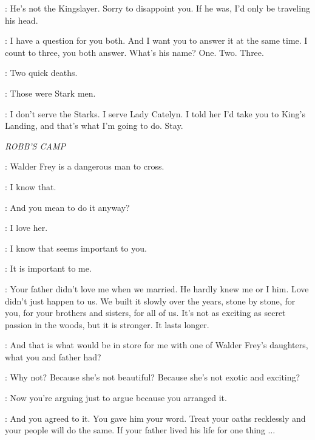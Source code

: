 \BRIENNE: He's not the Kingslayer. Sorry to disappoint you. If he was, I'd only be traveling his head. 

\STARKSOLDIERb: I have a question for you both. And I want you to answer it at the same time. I count to three, you both answer. What's his name? One. Two. Three. 


\BRIENNE: Two quick deaths. 


\JAIME: Those were Stark men. 

\BRIENNE: I don't serve the Starks. I serve Lady Catelyn. I told her I'd take you to King's Landing, and that's what I'm going to do. Stay.


\scene

\textit{ROBB'S CAMP} 


\CATELYN: Walder Frey is a dangerous man to cross. 

\ROBB: I know that. 

\CATELYN: And you mean to do it anyway? 

\ROBB: I love her. 

\CATELYN: I know that seems important to you. 

\ROBB: It is important to me. 

\CATELYN: Your father didn't love me when we married. He hardly knew me or I him. Love didn't just happen to us. We built it slowly over the years, stone by stone, for you, for your brothers and sisters, for all of us. It's not as exciting as secret passion in the woods, but it is stronger. It lasts longer. 

\ROBB: And that is what would be in store for me with one of Walder Frey's daughters, what you and father had? 

\CATELYN: Why not? Because she's not beautiful? Because she's not exotic and exciting? 

\ROBB: Now you're arguing just to argue because you arranged it. 

\CATELYN: And you agreed to it. You gave him your word. Treat your oaths recklessly and your people will do the same. If your father lived his life for one thing $\ldots$  


